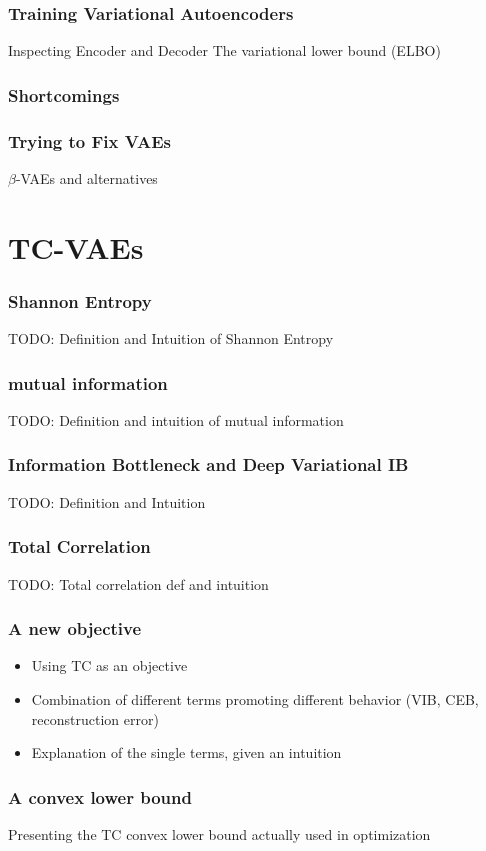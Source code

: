 \documentclass{beamer}
\theoremstyle{definition}
\begin{document}
    \begin{frame}
      \frametitle{Training Variational Autoencoders}
      Inspecting Encoder and Decoder
      The variational lower bound (ELBO)
    \end{frame}

    \begin{frame}
      \frametitle{Shortcomings}
    \end{frame}

    \begin{frame}
      \frametitle{Trying to Fix VAEs}
      $\beta$-VAEs and alternatives
    \end{frame}


  \section{TC-VAEs}

    \begin{frame}
      \frametitle{Shannon Entropy}
      TODO: Definition and Intuition of Shannon Entropy
    \end{frame}

    \begin{frame}
      \frametitle{mutual information}
      TODO: Definition and intuition of mutual information
    \end{frame}

    \begin{frame}
      \frametitle{Information Bottleneck and Deep Variational IB}
      TODO: Definition and Intuition
    \end{frame}

    \begin{frame}
      \frametitle{Total Correlation}
      TODO: Total correlation def and intuition
    \end{frame}

    \begin{frame}
      \frametitle{A new objective}
      \begin{itemize}
        \item Using TC as an objective
        \item Combination of different terms promoting different behavior (VIB, CEB, reconstruction error)
        \item Explanation of the single terms, given an intuition
      \end{itemize}
    \end{frame}

    \begin{frame}
      \frametitle{A convex lower bound}
      Presenting the TC convex lower bound actually used in optimization
    \end{frame}
\end{document}
